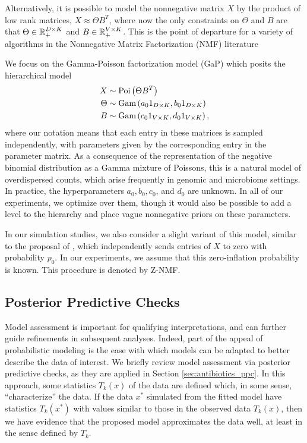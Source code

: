\documentclass[oupdraft]{bio}
\begin{document}
Alternatively, it is possible to model the nonnegative matrix $X$ by the product
of low rank matrices, $X \approx \Theta B^{T}$, where now the only constraints
on $\Theta$ and $B$ are that $\Theta \in \mathbb{R}_{+}^{D \times K}$ and $B \in
\mathbb{R}_{+}^{V \times K}$. This is the point of departure for a variety of algorithms
in the Nonnegative Matrix Factorization (NMF) literature
\citep{wang2013nonnegative}

We focus on the Gamma-Poisson factorization model (GaP) \citep{canny2004gap}
which posits the hierarchical model
\begin{align*}
X &\sim \textnormal{Poi}\left(\Theta B^{T}\right) \\
\Theta &\sim \textnormal{Gam}\left(a_{0} 1_{D \times K}, b_{0} 1_{D \times K}\right) \\
B &\sim \textnormal{Gam}\left(c_{0} 1_{V \times K}, d_{0} 1_{V \times K} \right),
\end{align*}
where our notation means that each entry in these matrices is sampled
independently, with parameters given by the corresponding entry in the parameter
matrix. As a consequence of the representation of the negative binomial
distribution as a Gamma mixture of Poissons, this is a natural model of
overdispersed counts, which arise frequently in genomic and microbiome settings.
In practice, the hyperparameters $a_{0}, b_{0}, c_{0}$, and $d_{0}$ are unknown.
In all of our experiments, we optimize over them, though it would also be
possible to add a level to the hierarchy and place vague nonnegative priors on
these parameters.

In our simulation studies, we also consider a slight variant of this model,
similar to the proposal of \citep{romero2014composition}, which independently
sends entries of $X$ to zero with probability $p_{0}$. In our experiments, we
assume that this zero-inflation probability is known. This procedure is denoted
by Z-NMF.

\subsection{Posterior Predictive Checks}
\label{sec:ppc_overview}

Model assessment is important for qualifying interpretations, and can further
guide refinements in subsequent analyses. Indeed, part of the appeal of
probabilistic modeling is the ease with which models can be adapted to better
describe the data of interest. We briefly review model assessment via posterior
predictive checks, as they are applied in Section \ref{sec:antibiotics_ppc}. In
this approach, some statistics $T_{k}\left(x\right)$ of the data are defined
which, in some sense, ``characterize'' the data. If the data $x^{\ast}$
simulated from the fitted model have statistics $T_{k}\left(x^{\ast}\right)$
with values similar to those in the observed data $T_{k}\left(x\right)$, then we
have evidence that the proposed model approximates the data well, at least in
the sense defined by $T_{k}$.
\end{document}
